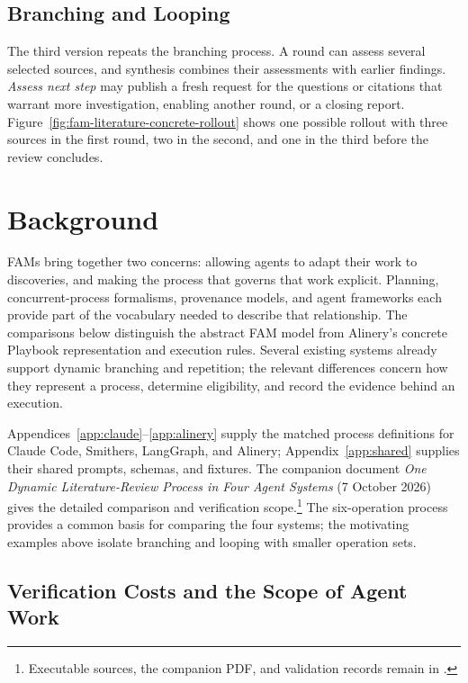 \documentclass[letterpaper]{article}
\theoremstyle{definition}
\begin{document}
\subsection{Branching and Looping}

The third version repeats the branching process. A round can assess several
selected sources, and synthesis combines their assessments with earlier
findings. \emph{Assess next step} may publish a fresh request for the questions
or citations that warrant more investigation, enabling another round, or a
closing report. Figure~\ref{fig:fam-literature-concrete-rollout} shows one
possible rollout with three sources in the first round, two in the second,
and one in the third before the review concludes.

\section{Background}
\label{sec:background}

FAMs bring together two concerns: allowing agents to adapt their work to
discoveries, and making the process that governs that work explicit. Planning,
concurrent-process formalisms, provenance models, and agent frameworks each
provide part of the vocabulary needed to describe that relationship. The
comparisons below distinguish the abstract FAM model from Alinery's concrete
Playbook representation and execution rules. Several existing systems already
support dynamic branching and repetition; the relevant differences concern
how they represent a process, determine eligibility, and record the evidence
behind an execution.

Appendices~\ref{app:claude}--\ref{app:alinery} supply the matched process
definitions for Claude Code, Smithers, LangGraph, and Alinery;
Appendix~\ref{app:shared} supplies their shared prompts, schemas, and fixtures.
The companion document \emph{One Dynamic Literature-Review Process in Four
Agent Systems} (7 October 2026) gives the detailed comparison and verification
scope.\footnote{Executable sources, the companion PDF, and validation records
remain in .}
The six-operation process provides a common basis for comparing the four
systems; the motivating examples above isolate branching and looping with
smaller operation sets.

\subsection{Verification Costs and the Scope of Agent Work}
\end{document}
